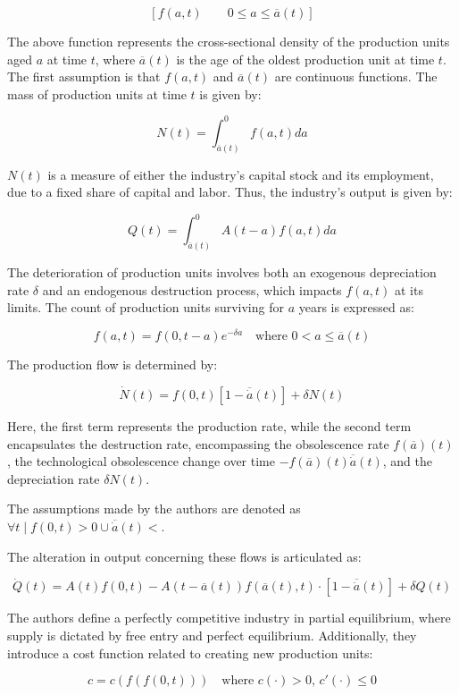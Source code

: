 \documentclass[12pt]{article}
\begin{document}
\[\left[ f(a,t) \qquad 0\leq a \leq \overline{a}(t) \right]\]

The above function represents the cross-sectional density of the production units aged \(a\) at time \(t\), where
\(\overline{a}(t)\) is the age of the oldest production unit at time \(t\). The first assumption is that \(f(a,t)\) and
\(\overline{a}(t)\) are continuous functions. The mass of production units at time \(t\) is given by:

\[N(t) = \int_{\overline{a}(t)}^{0}f(a,t)da\]

\(N(t)\) is a measure of either the industry's capital stock and its employment, due to a fixed share of capital and
labor. Thus, the industry's output is given by:

\[Q(t) = \int_{\overline{a}(t)}^{0}A(t-a)f(a,t)da\]

The deterioration of production units involves both an exogenous depreciation rate \(\delta\) and an endogenous
destruction process, which impacts \(f(a,t)\) at its limits. The count of production units surviving for \(a\) years is
expressed as: 

\[f(a,t)= f(0,t-a)e^{-\delta a} \quad \text{where } 0 < a \leq \overline{a}(t)\]

The production flow is determined by:

\[\dot{N}(t) = f(0,t) [1-\overline{\dot{a}}(t)] + \delta N(t)\]

Here, the first term represents the production rate, while the second term encapsulates the destruction rate,
encompassing the obsolescence rate \(f(\overline{a})(t)\), the technological obsolescence change over time
\(-f(\overline{a})(t)\overline{\dot{a}}(t)\), and the depreciation rate \(\delta N(t)\). 

The assumptions made by the authors are denoted as \(\forall t \mid f(0,t)>0 \cup  \overline{\dot{a}}(t)<\).

The alteration in output concerning these flows is articulated as:

\[\dot{Q}(t) = A(t)f(0,t) - A(t-\overline{a}(t))f(\overline{a}(t),t) \cdot [1-\overline{\dot{a}}(t)] + \delta Q(t)\]

The authors define a perfectly competitive industry in partial equilibrium, where supply is dictated by free entry and
perfect equilibrium. Additionally, they introduce a cost function related to creating new production units: 

\[c = c\left(f\left(f(0,t)\right)\right) \quad \text{where } c(\cdot)>0, \, c'(\cdot)\leq 0\]
\end{document}
